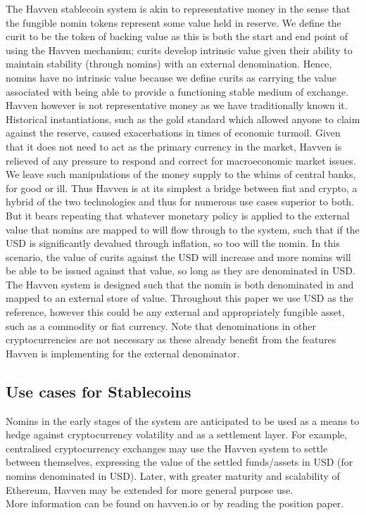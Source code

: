 \noindent The Havven stablecoin system is akin to representative money in the sense that the fungible nomin
tokens represent some value held in reserve. We define the curit to be the token of backing value as this is
both the start and end point of using the Havven mechanism; curits develop intrinsic value given their ability
to maintain stability (through nomins) with an external denomination. Hence, nomins have no intrinsic value
because we define curits as carrying the value associated with being able to provide a functioning stable
medium of exchange. \\

\noindent Havven however is not representative money as we have traditionally known it. Historical instantiations,
such as the gold standard which allowed anyone to claim against the reserve, caused exacerbations in times of
economic turmoil. Given that it does not need to act as the primary currency in the market, Havven is relieved
of any pressure to respond and correct for macroeconomic market issues. We leave such manipulations of the money
supply to the whims of central banks, for good or ill. Thus Havven is at its simplest a bridge between fiat and
crypto, a hybrid of the two technologies and thus for numerous use cases superior to both. But it bears
repeating that whatever monetary policy is applied to the external value that nomins are mapped to will
flow through to the system, such that if the USD is significantly devalued through inflation, so too will the
nomin. In this scenario, the value of curits against the USD will increase and more nomins will be able to be
issued against that value, so long as they are denominated in USD. \\

\noindent The Havven system is designed such that the nomin is both denominated in and
mapped to an external store of value. Throughout this paper we use USD as the reference, however this could
be any external and appropriately fungible asset, such as a commodity or fiat currency. Note that denominations
in other cryptocurrencies are not necessary as these already benefit from the features Havven is implementing
for the external denominator. \\

\subsection{Use cases for Stablecoins}

\noindent Nomins in the early stages of the system are anticipated to be used as a means to hedge against
cryptocurrency volatility and as a settlement layer. For example, centralised cryptocurrency exchanges may
use the Havven system to settle between themselves, expressing the value of the settled funds/assets in USD
(for nomins denominated in USD). Later, with greater maturity and scalability of Ethereum, Havven may be
extended for more general purpose use. \\


\noindent More information can be found on havven.io or by reading the position paper.

\pagebreak
